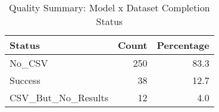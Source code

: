 \begin{table}
\caption{Quality Summary: Model x Dataset Completion Status}
\label{tab:quality_summary}
\begin{tabular}{lrr}
\toprule
Status & Count & Percentage \\
\midrule
No_CSV & 250 & 83.3 \\
Success & 38 & 12.7 \\
CSV_But_No_Results & 12 & 4.0 \\
\bottomrule
\end{tabular}
\end{table}
